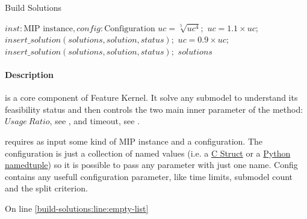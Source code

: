 \begin{algorithm}[H]
    \caption{Build Solutions}\label{algo:build-solutions}
    \begin{algorithmic}[1]
        \REQUIRE $inst: \text{MIP instance}, config: \text{Configuration}$
         
         \label{build-solutions:line:empty-list}
                \STATE $uc = \sqrt[5]{uc^4};$ 
                \STATE $uc = 1.1 \times uc;$ 
                \STATE $insert\_solution(solutions, solution, status);$
                \STATE $uc = 0.9 \times uc;$ 
                \STATE $insert\_solution(solutions, solution, status);$
                \ENDIF
            \ENDIF
        \ENDFOR
        \RETURN $solutions$
    \end{algorithmic}
\end{algorithm}

\paragraph{Description}  is a core component of Feature Kernel. It solve any submodel to understand its feasibility status and then controls 
the two main inner parameter of the method: $Usage\ Ratio$, see , and timeout, see .

 requires as input some kind of MIP instance and a configuration. The configuration is just a collection of named values 
(i.e. a \href{https://en.wikipedia.org/wiki/Struct_(C_programming_language)}{C Struct} or a 
\href{https://docs.python.org/3/library/collections.html#namedtuple-factory-function-for-tuples-with-named-fields}{Python namedtuple}) 
so it is possible to pass any parameter with just one name. Config contains any usefull configuration parameter, like time limits, submodel count and the split 
criterion. 

On line \ref{build-solutions:line:empty-list}







